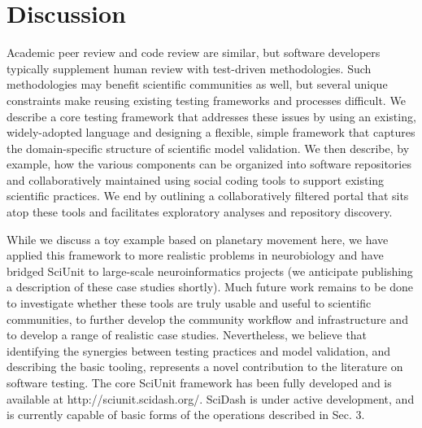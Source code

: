 \documentclass[9pt]{sig-alternate}
\begin{document}
\section{Discussion}
Academic peer review and code review are similar, but software developers typically supplement human review with test-driven methodologies. Such methodologies may benefit scientific communities as well, but several unique  constraints make reusing existing testing frameworks and processes difficult. We describe a core testing framework that addresses these issues  by using an existing, widely-adopted language and designing a flexible, simple framework that captures the domain-specific structure of scientific model validation. We then describe, by example, how the various components can be organized into software repositories and collaboratively maintained using social coding tools to support existing scientific practices. We end by outlining a collaboratively filtered portal that sits atop these tools and facilitates exploratory analyses and repository discovery. 

While we discuss a toy example based on planetary movement here, we have applied this framework to more realistic problems in neurobiology and have bridged SciUnit to large-scale neuroinformatics projects (we anticipate publishing a description of these case studies shortly). Much future work remains to be done to investigate whether these tools are truly usable and useful to scientific communities, to further develop the community workflow and infrastructure and to develop a range of realistic case studies. Nevertheless, we believe that identifying the synergies between testing practices and model validation, and describing the basic tooling, represents a novel contribution to the literature on software testing. The core SciUnit framework has been fully developed and is available at http://sciunit.scidash.org/. SciDash is under active development, and is currently capable of basic forms of the operations described in Sec. 3. %
\end{document}
